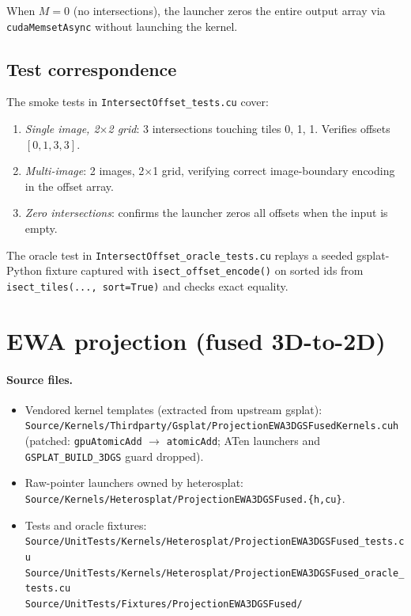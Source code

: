 \documentclass[11pt]{article}
\begin{document}
When $M = 0$ (no intersections), the launcher zeros the entire output
array via \texttt{cudaMemsetAsync} without launching the kernel.

\subsection{Test correspondence}

The smoke tests in \texttt{IntersectOffset\_tests.cu} cover:
\begin{enumerate}
  \item \emph{Single image, 2$\times$2 grid}: 3 intersections
  touching tiles 0, 1, 1. Verifies offsets $[0, 1, 3, 3]$.
  \item \emph{Multi-image}: 2 images, 2$\times$1 grid, verifying
  correct image-boundary encoding in the offset array.
  \item \emph{Zero intersections}: confirms the launcher zeros all
  offsets when the input is empty.
\end{enumerate}
The oracle test in \texttt{IntersectOffset\_oracle\_tests.cu} replays
a seeded gsplat-Python fixture captured with
\texttt{isect\_offset\_encode()} on sorted ids from
\texttt{isect\_tiles(..., sort=True)} and checks exact equality.

\section{EWA projection (fused 3D-to-2D)}
\label{sec:projection}

\paragraph{Source files.}
\begin{itemize}
  \item Vendored kernel templates (extracted from upstream gsplat):\\
  \texttt{Source/Kernels/Thirdparty/Gsplat/ProjectionEWA3DGSFusedKernels.cuh}
  (patched: \texttt{gpuAtomicAdd} $\to$ \texttt{atomicAdd}; ATen
  launchers and \texttt{GSPLAT\_BUILD\_3DGS} guard dropped).
  \item Raw-pointer launchers owned by heterosplat:\\
  \texttt{Source/Kernels/Heterosplat/ProjectionEWA3DGSFused.\{h,cu\}}.
  \item Tests and oracle fixtures:\\
  \texttt{Source/UnitTests/Kernels/Heterosplat/ProjectionEWA3DGSFused\_tests.cu}\\
  \texttt{Source/UnitTests/Kernels/Heterosplat/ProjectionEWA3DGSFused\_oracle\_tests.cu}\\
  \texttt{Source/UnitTests/Fixtures/ProjectionEWA3DGSFused/}
\end{itemize}
\end{document}
